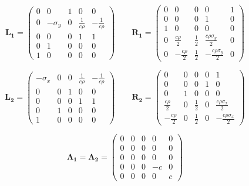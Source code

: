 \begin{equation*}
    \bm{L_1} = \begin{pmatrix}
        0 & 0 & 1 & 0 & 0 \\
        0 & -\sigma_y & 0 & \frac{1}{c \rho} & -\frac{1}{c \rho} \\
        0 & 0 & 0 & 1 & 1 \\
        0 & 1 & 0 & 0 & 0 \\
        1 & 0 & 0 & 0 & 0
    \end{pmatrix} \qquad
    \bm{R_1} = \begin{pmatrix}
        0 & 0 & 0 & 0 & 1 \\
        0 & 0 & 0 & 1 & 0 \\
        1 & 0 & 0 & 0 & 0 \\
        0 & \frac{c \rho}{2} & \frac{1}{2} & \frac{c \rho \sigma_y}{2} & 0  \\
        0 & -\frac{c \rho}{2}  & \frac{1}{2} & - \frac{c \rho \sigma_y}{2} & 0
    \end{pmatrix}
\end{equation*}
    
\begin{equation*}
    \bm{L_2} = \begin{pmatrix}
        -\sigma_x & 0 & 0 & \frac{1}{c \rho} & -\frac{1}{c \rho} \\
        0 & 0 & 1 & 0 & 0 \\
        0 & 0 & 0 & 1 & 1 \\
        0 & 1 & 0 & 0 & 0 \\
        1 & 0 & 0 & 0 & 0
    \end{pmatrix} \qquad
    \bm{R_2} = \begin{pmatrix}
        0 & 0 & 0 & 0 & 1 \\
        0 & 0 & 0 & 1 & 0 \\
        0 & 1 & 0 & 0 & 0 \\
        \frac{c \rho}{2} & 0 & \frac{1}{2} & 0 & \frac{c \rho \sigma_x}{2}  \\
        -\frac{c \rho}{2} & 0 & \frac{1}{2} & 0 & - \frac{c \rho \sigma_x}{2} 
    \end{pmatrix}
\end{equation*}

\begin{equation*}
    \bm{\Lambda_1} = \bm{\Lambda_2} = \begin{pmatrix}
        0 & 0 & 0 & 0 & 0 \\
        0 & 0 & 0 & 0 & 0 \\
        0 & 0 & 0 & 0 & 0 \\
        0 & 0 & 0 & -c & 0 \\
        0 & 0 & 0 & 0 & c
    \end{pmatrix} 
\end{equation*}
    

